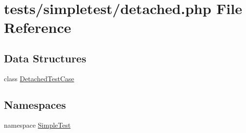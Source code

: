 \hypertarget{detached_8php}{\section{tests/simpletest/detached.php File Reference}
\label{detached_8php}
}
\subsection*{Data Structures}
\begin{DoxyCompactItemize}
\item 
class \hyperlink{class_detached_test_case}{Detached\-Test\-Case}
\end{DoxyCompactItemize}
\subsection*{Namespaces}
\begin{DoxyCompactItemize}
\item 
namespace \hyperlink{namespace_simple_test}{Simple\-Test}
\end{DoxyCompactItemize}
